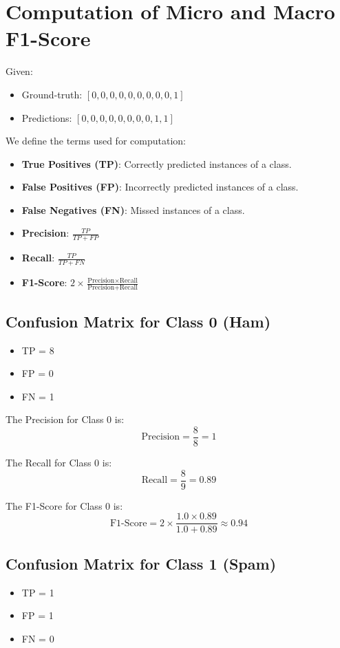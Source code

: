 \documentclass{article}
\begin{document}
\section{Computation of Micro and Macro F1-Score}

Given:
\begin{itemize}
    \item Ground-truth: $[0, 0, 0, 0, 0, 0, 0, 0, 0, 1]$
    \item Predictions: $[0, 0, 0, 0, 0, 0, 0, 0, 1, 1]$
\end{itemize}

We define the terms used for computation:
\begin{itemize}
    \item \textbf{True Positives (TP)}: Correctly predicted instances of a class.
    \item \textbf{False Positives (FP)}: Incorrectly predicted instances of a class.
    \item \textbf{False Negatives (FN)}: Missed instances of a class.
    \item \textbf{Precision}: $\frac{TP}{TP + FP}$
    \item \textbf{Recall}: $\frac{TP}{TP + FN}$
    \item \textbf{F1-Score}: $2 \times \frac{\text{Precision} \times \text{Recall}}{\text{Precision} + \text{Recall}}$
\end{itemize}

\subsection{Confusion Matrix for Class 0 (Ham)}
\begin{itemize}
    \item TP = 8
    \item FP = 0
    \item FN = 1
\end{itemize}

The Precision for Class 0 is:
$$ \text{Precision} = \frac{8}{8} = 1 $$

The Recall for Class 0 is:
$$ \text{Recall} = \frac{8}{9} = 0.89 $$

The F1-Score for Class 0 is:
$$ \text{F1-Score} = 2 \times \frac{1.0 \times 0.89}{1.0 + 0.89} \approx 0.94 $$

\subsection{Confusion Matrix for Class 1 (Spam)}
\begin{itemize}
    \item TP = 1
    \item FP = 1
    \item FN = 0
\end{itemize}
\end{document}
